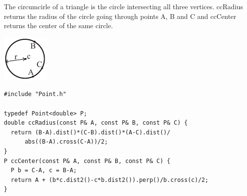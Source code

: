 \begin{minipage}{75mm}
The circumcirle of a triangle is the circle intersecting all three vertices. ccRadius returns the radius of the circle going through points A, B and C and ccCenter returns the center of the same circle.
\end{minipage}
\begin{minipage}{15mm}
\vspace{-2mm}
\includegraphics[width=\textwidth]{../code/Geometry/Circle/circumcircle}
\end{minipage}
\begin{verbatim}
#include "Point.h"

typedef Point<double> P;
double ccRadius(const P& A, const P& B, const P& C) {
  return (B-A).dist()*(C-B).dist()*(A-C).dist()/
      abs((B-A).cross(C-A))/2;
}
P ccCenter(const P& A, const P& B, const P& C) {
  P b = C-A, c = B-A;
  return A + (b*c.dist2()-c*b.dist2()).perp()/b.cross(c)/2;
}
\end{verbatim}
